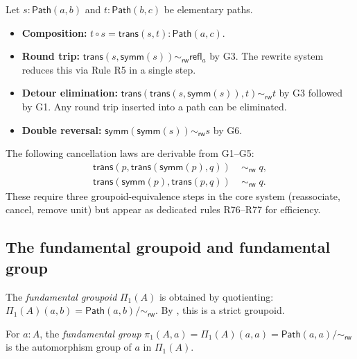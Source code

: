 \documentclass[manuscript]{BSLstyle}
\newcommand{\Path}{\mathsf{Path}}
\newcommand{\refl}{\mathsf{refl}}
\newcommand{\symm}{\mathsf{symm}}
\newcommand{\trans}{\mathsf{trans}}
\newcommand{\rweq}{\sim_{\mathsf{rw}}}
\begin{document}
\begin{example}\label{ex:path-groupoid-ops}
Let $s : \Path(a, b)$ and $t : \Path(b, c)$ be elementary paths.
\begin{itemize}
\item \textbf{Composition:} $t \circ s = \trans(s, t) : \Path(a, c)$.
\item \textbf{Round trip:} $\trans(s, \symm(s)) \rweq \refl_a$ by G3.
  The rewrite system reduces this via Rule R5 in a single step.
\item \textbf{Detour elimination:}
  $\trans(\trans(s, \symm(s)), t) \rweq t$ by G3 followed by G1.
  Any round trip inserted into a path can be eliminated.
\item \textbf{Double reversal:} $\symm(\symm(s)) \rweq s$ by G6.
\end{itemize}
\end{example}

\begin{proposition}\label{prop:cancellation}
The following cancellation laws are derivable from G1--G5:
\begin{align*}
\trans(p, \trans(\symm(p), q))
  &\;\rweq\; q, \\
\trans(\symm(p), \trans(p, q))
  &\;\rweq\; q.
\end{align*}
These require three groupoid-equivalence steps in the core system
(reassociate, cancel, remove unit) but appear as dedicated rules R76--R77
for efficiency.
\end{proposition}

\subsection{The fundamental groupoid and fundamental group}

\begin{definition}\label{def:fundamental-groupoid}
The \emph{fundamental groupoid} $\Pi_1(A)$ is obtained by quotienting:
$\Pi_1(A)(a, b) = \Path(a, b)/{\rweq}$.
By , this is a strict groupoid.
\end{definition}

\begin{definition}\label{def:fundamental-group}
For $a : A$, the \emph{fundamental group}
$\pi_1(A, a) = \Pi_1(A)(a, a) = \Path(a, a)/{\rweq}$
is the automorphism group of $a$ in $\Pi_1(A)$.
\end{definition}
\end{document}

